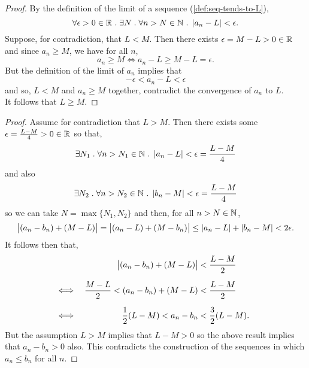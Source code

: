 \documentclass[../MathsNotesBase.tex]{subfiles}
\begin{document}
{		\bigskip
		\begin{proof}
			By the definition of the limit of a sequence (\ref{def:seq-tends-to-L}),
			\[ \forall \epsilon > 0 \in \mathbb{R}^{} \;.\; \exists N \;.\; \forall n > N \in \mathbb{N}^{} \;.\; \left\lvert a_n - L\right\rvert < \epsilon. \]
			Suppose, for contradiction, that ${ L < M }$. Then there exists ${ \epsilon = M - L > 0 \in \mathbb{R}^{} }$ and since ${ a_n \geq M }$, we have for all $n$,
			\[ a_n \geq M \iff a_n - L \geq M - L = \epsilon. \]
			But the definition of the limit of $a_n$ implies that
			\[ -\epsilon < a_n - L < \epsilon \]
			and so, ${ L < M }$ and ${ a_n \geq M }$ together, contradict the convergence of $a_n$ to $L$.\\
			It follows that ${ L \geq M }$.
		\end{proof}
	
		\bigskip
		\begin{proof}
			Assume for contradiction that ${ L > M }$. Then there exists some ${ \epsilon = \frac{L - M}{4} > 0 \in \mathbb{R}^{} }$ so that,
			\[ \exists N_1 \;.\; \forall n > N_1 \in \mathbb{N}^{} \;.\; \left\lvert a_n - L\right\rvert < \epsilon = \frac{L - M}{4} \]
			and also
			\[ \exists N_2 \;.\; \forall n > N_2 \in \mathbb{N}^{} \;.\; \left\lvert b_n - M\right\rvert < \epsilon = \frac{L - M}{4} \]
			so we can take ${ N = \max \{N_1,N_2\} }$ and then, for all ${ n > N \in \mathbb{N}^{} }$,
			\[ \left\lvert(a_n - b_n) + (M - L)\right\rvert = \left\lvert(a_n - L) + (M - b_n)\right\rvert \leq \left\lvert a_n - L\right\rvert + \left\lvert b_n - M\right\rvert < 2\epsilon. \]
			It follows then that,
			\[\begin{aligned}
				&& \abs{(a_n - b_n) + (M - L)} &< \frac{L - M}{2} \nn
				&\iff & \frac{M - L}{2} < (a_n - b_n) + (M - L) &<  \frac{L - M}{2} &\sidecomment{} \nn
				&\iff & \frac{1}{2}(L - M) < a_n - b_n &<  \frac{3}{2}(L - M).
			\end{aligned}\]
			But the assumption ${ L > M }$ implies that ${ L - M > 0 }$ so the above result implies that ${ a_n - b_n > 0 }$ also. This contradicts the construction of the sequences in which ${ a_n \leq b_n }$ for all $n$.
		\end{proof}

	
		
}
\end{document}
